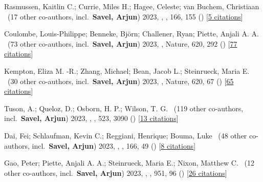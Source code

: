 \item[{\color{numcolor}\scriptsize28}] Rasmussen, Kaitlin C.; Currie, Miles H.; Hagee, Celeste; van Buchem, Christiaan \etal\ ({17} other co-authors, incl.\ \textbf{Savel, Arjun}) 2023, , \aj, {166}, 155 () [\href{https://ui.adsabs.harvard.edu/abs/2023AJ....166..155R}{5 citations}]

\item[{\color{numcolor}\scriptsize27}] Coulombe, Louis-Philippe; Benneke, Bj{\"o}rn; Challener, Ryan; Piette, Anjali A. A. \etal\ ({73} other co-authors, incl.\ \textbf{Savel, Arjun}) 2023, , Nature, {620}, 292 () [\href{https://ui.adsabs.harvard.edu/abs/2023Natur.620..292C}{77 citations}]

\item[{\color{numcolor}\scriptsize26}] Kempton, Eliza M. -R.; Zhang, Michael; Bean, Jacob L.; Steinrueck, Maria E. \etal\ ({30} other co-authors, incl.\ \textbf{Savel, Arjun}) 2023, , Nature, {620}, 67 () [\href{https://ui.adsabs.harvard.edu/abs/2023Natur.620...67K}{65 citations}]

\item[{\color{numcolor}\scriptsize25}] Tuson, A.; Queloz, D.; Osborn, H. P.; Wilson, T. G. \etal\ ({119} other co-authors, incl.\ \textbf{Savel, Arjun}) 2023, , \mnras, {523}, 3090 () [\href{https://ui.adsabs.harvard.edu/abs/2023MNRAS.523.3090T}{13 citations}]

\item[{\color{numcolor}\scriptsize24}] Dai, Fei; Schlaufman, Kevin C.; Reggiani, Henrique; Bouma, Luke \etal\ ({48} other co-authors, incl.\ \textbf{Savel, Arjun}) 2023, , \aj, {166}, 49 () [\href{https://ui.adsabs.harvard.edu/abs/2023AJ....166...49D}{8 citations}]

\item[{\color{numcolor}\scriptsize23}] Gao, Peter; Piette, Anjali A. A.; Steinrueck, Maria E.; Nixon, Matthew C. \etal\ ({12} other co-authors, incl.\ \textbf{Savel, Arjun}) 2023, , \apj, {951}, 96 () [\href{https://ui.adsabs.harvard.edu/abs/2023ApJ...951...96G}{26 citations}]

